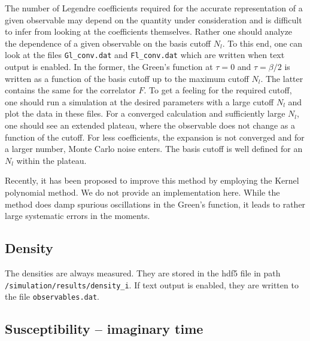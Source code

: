 \documentclass[aps,prb,floatfix,superscriptaddress,twocolumn,notitlepage]{revtex4-1}
\begin{document}
The number of Legendre coefficients required for the accurate representation of a given observable may depend on the quantity under consideration and is difficult to infer from looking at the coefficients themselves. Rather one should analyze the dependence of a given observable on the basis cutoff $N_{l}$. To this end, one can look at the files \verb#Gl_conv.dat# and \verb#Fl_conv.dat# which are written when text output is enabled. In the former, the Green's function at $\tau=0$ and $\tau=\beta/2$ is written as a function of the basis cutoff up to the maximum cutoff $N_{l}$. The latter contains the same for the correlator $F$. To get a feeling for the required cutoff, one should run a simulation at the desired parameters with a large cutoff $N_{l}$ and plot the data in these files.
For a converged calculation and sufficiently large $N_{l}$, one should see an extended plateau, where the observable does not change as a function of the cutoff. For less coefficients, the expansion is not converged and for a larger number, Monte Carlo noise enters. The basis cutoff is well defined for an $N_{l}$ within the plateau.

Recently, it has been proposed to improve this method by employing the Kernel polynomial method\cite{Huang12}. We do not provide an implementation here. While the method does damp spurious oscillations in the Green's function, it leads to rather large systematic errors in the moments.

\subsection{Density}

The densities are always measured. They are stored in the hdf5 file in path \verb#/simulation/results/density_i#. If text output is enabled, they are written to the file \verb#observables.dat#.

\subsection{Susceptibility -- imaginary time}
\end{document}
